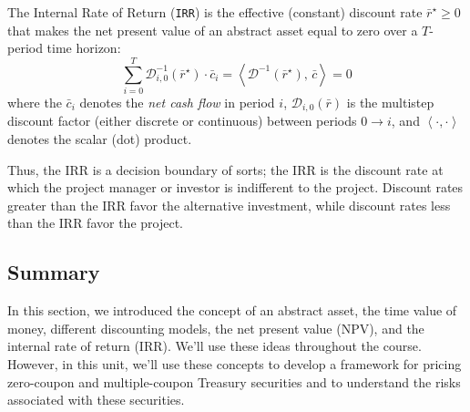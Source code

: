 \documentclass[11pt]{article}
\theoremstyle{definition}
\begin{document}
\begin{definition}\label{defn:internal-rate-of-return}
The Internal Rate of Return (\texttt{IRR}) is the effective (constant) discount rate $\bar{r}^{\star}\geq{0}$
that makes the net present value of an abstract asset equal to zero over a $T$-period time horizon:
\begin{equation}
\sum_{i=0}^{T}{\mathcal{D}_{i,0}^{-1}}(\bar{r}^{\star})\cdot\bar{c}_{i} = \left<\mathcal{D}^{-1}(\bar{r}^{\star}),\,\bar{c}\right> = 0
\end{equation}
where the $\bar{c}_{i}$ denotes the \textit{net cash flow} in period $i$, 
$\mathcal{D}_{i,0}(\bar{r})$ is the multistep discount factor (either discrete or continuous) between periods $0\rightarrow{i}$, and
$\left<\cdot,\cdot\right>$ denotes the scalar (dot) product.

\end{definition}
Thus, the IRR is a decision boundary of sorts; the IRR is the discount rate at which the project manager or investor is indifferent to the project.
Discount rates greater than the IRR favor the alternative investment, while discount rates less than the IRR
favor the project.

\subsection{Summary}
In this section, we introduced the concept of an abstract asset, the time value of money, different discounting models, the net present value (NPV), and the internal rate of return (IRR).
We'll use these ideas throughout the course. However, in this unit, we'll use these concepts to develop a framework for pricing zero-coupon and multiple-coupon Treasury securities 
and to understand the risks associated with these securities.

\clearpage
\end{document}
